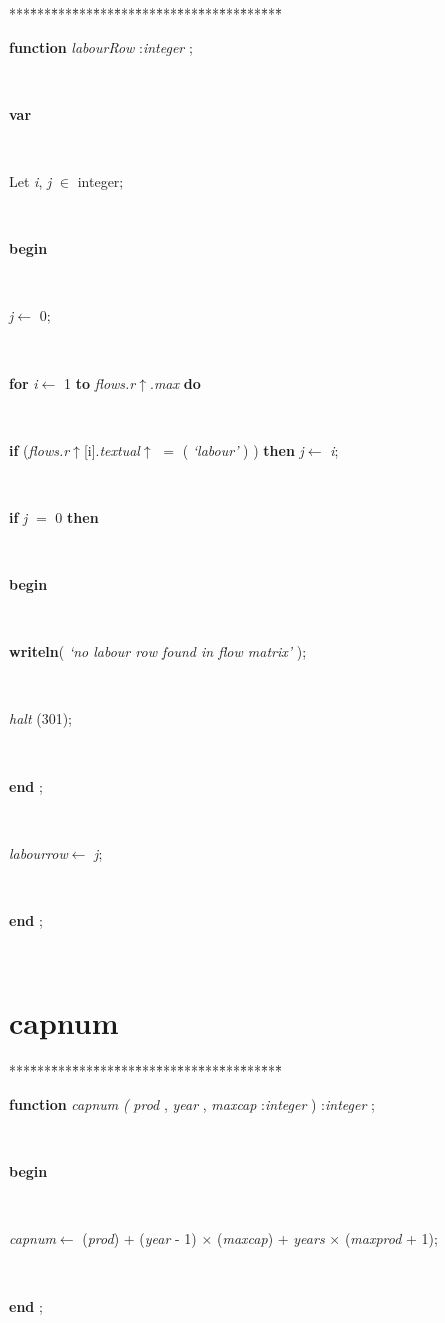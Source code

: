 \documentclass[10pt, a4paper]{article}
\begin{document}
\begin{tabbing}
***\=***\=***\=***\=***\=***\=***\=***\=***\=***\=***\=***\=***\=\kill
\parbox{14cm}{\textsf{\textbf{function}  \textit{labourRow} :\textit{integer} ;}}\\
\+\parbox{14cm}{\textsf{\textbf{var} }}\\
\parbox{14cm}{\textsf{Let \textit{i}, \textit{j} $\in$ integer;}}\\
\-\<\+\parbox{14cm}{\textsf{\textbf{begin} }}\\
\parbox{14cm}{\textsf{\textit{j}$\leftarrow$ 0}; }\\
\+\parbox{14cm}{\textsf {\textbf {for } \textsf{\textit{i}$\leftarrow$ 1} \textbf{ to } \textsf{\textit{flows.r}$\uparrow$.\textit{max}} \textbf{ do } }}\\
\-\parbox{14cm}{\textsf {\textbf {if } \textsf{(\textit{flows.r}$\uparrow$\textit{}[i].\textit{textual}$\uparrow$ $=$  (\textit{\textrm{\textup { `labour' } }}) )} \textbf{ then } \textsf{\textit{j}$\leftarrow$ \textit{i}}; }}\\
\+\parbox{14cm}{\textsf {\textbf {if } \textsf{\textit{j} $=$ 0} \textbf{ then } }}\\
\<\parbox{14cm}{\textsf{\textbf{begin} }}\\
\parbox{14cm}{\textsf{\textbf{writeln}(\textit{\textrm{\textup { `no labour row found in flow matrix' } }})}; }\\
\parbox{14cm}{\textsf{\textit{halt} (301)}; }\\
\<\-\parbox{14cm}{\textsf{\textbf{end} ;}}\\
\parbox{14cm}{\textsf{\textit{labourrow}$\leftarrow$ \textit{j}}; }\\
\<\-\parbox{14cm}{\textsf{\textbf{end} ;}}\\
\end{tabbing}
\section{capnum}\label{sec:harmonyplancapnum}

\begin{tabbing}
***\=***\=***\=***\=***\=***\=***\=***\=***\=***\=***\=***\=***\=\kill
\parbox{14cm}{\textsf{\textbf{function}  \textit{capnum} \textit{(}  \textit{prod} , \textit{year} , \textit{maxcap} :\textit{integer} ) :\textit{integer} ;}}\\
\+\parbox{14cm}{\textsf{\textbf{begin} }}\\
\parbox{14cm}{\textsf{\textit{capnum}$\leftarrow$ (\textit{prod}) + (\textit{year} - 1) $\times$ (\textit{maxcap}) + \textit{years} $\times$ (\textit{maxprod} + 1)}; }\\
\<\-\parbox{14cm}{\textsf{\textbf{end} ;}}\\
\end{tabbing}
\end{document}
